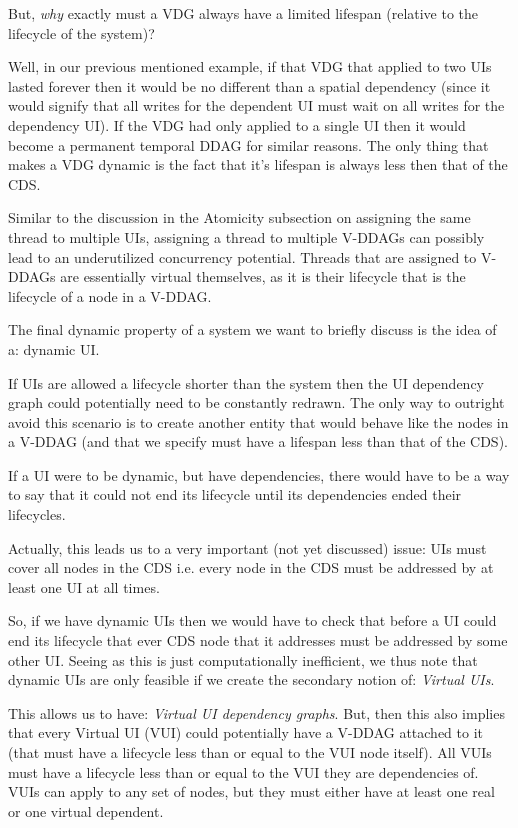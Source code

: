 But, \textit{why} exactly must a VDG always have a limited lifespan (relative to the lifecycle of the system)? 

Well, in our previous mentioned example, if that VDG that applied to two UIs lasted forever then it would be no different than a spatial dependency (since it would signify that all writes for the dependent UI must wait on all writes for the dependency UI). If the VDG had only applied to a single UI then it would become a permanent temporal DDAG for similar reasons. The only thing that makes a VDG dynamic is the fact that it's lifespan is always less then that of the CDS.

Similar to the discussion in the Atomicity subsection on assigning the same thread to multiple UIs, assigning a thread to multiple V-DDAGs can possibly lead to an underutilized concurrency potential. Threads that are assigned to V-DDAGs are essentially virtual themselves, as it is their lifecycle that is the lifecycle of a node in a V-DDAG.

The final dynamic property of a system we want to briefly discuss is the idea of a: dynamic UI.

If UIs are allowed a lifecycle shorter than the system then the UI dependency graph could potentially need to be constantly redrawn. The only way to outright avoid this scenario is to create another entity that would behave like the nodes in a V-DDAG (and that we specify must have a lifespan less than that of the CDS).

If a UI were to be dynamic, but have dependencies, there would have to be a way to say that it could not end its lifecycle until its dependencies ended their lifecycles.

Actually, this leads us to a very important (not yet discussed) issue: UIs must cover all nodes in the CDS i.e. every node in the CDS must be addressed by at least one UI at all times. 

So, if we have dynamic UIs then we would have to check that before a UI could end its lifecycle that ever CDS node that it addresses must be addressed by some other UI. Seeing as this is just computationally inefficient, we thus note that dynamic UIs are only feasible if we create the secondary notion of: \textit{Virtual UIs}.

This allows us to have: \textit{Virtual UI dependency graphs}. But, then this also implies that every Virtual UI (VUI) could potentially have a V-DDAG attached to it (that must have a lifecycle less than or equal to the VUI node itself). All VUIs must have a lifecycle less than or equal to the VUI they are dependencies of. VUIs can apply to any set of nodes, but they must either have at least one real or one virtual dependent.

